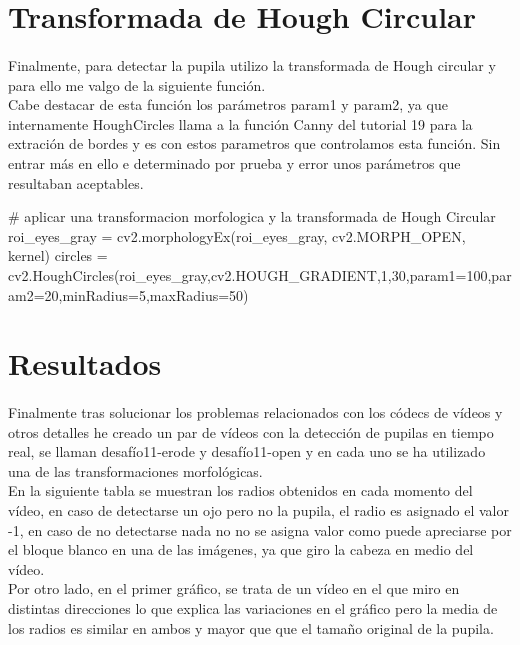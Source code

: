 \documentclass[es,gi]{ifirak}\usepackage[]{graphicx}\usepackage[]{color}
\begin{document}
\section{Transformada de Hough Circular}
\paragraph{}Finalmente, para detectar la pupila utilizo la transformada de Hough circular y para ello me valgo de la siguiente función.\\

Cabe destacar de esta función los parámetros param1 y param2, ya que internamente HoughCircles llama a la función Canny del tutorial 19 para la extración de bordes y es con estos parametros que controlamos esta función. Sin entrar más en ello e determinado por prueba y error unos parámetros que resultaban aceptables.\\

\begin{python}
                # aplicar una transformacion morfologica y la transformada de Hough Circular
                roi_eyes_gray  = cv2.morphologyEx(roi_eyes_gray, cv2.MORPH_OPEN, kernel)
                circles = cv2.HoughCircles(roi_eyes_gray,cv2.HOUGH_GRADIENT,1,30,param1=100,param2=20,minRadius=5,maxRadius=50)
\end{python}

\section{Resultados}
\paragraph{} Finalmente tras solucionar los problemas relacionados con los códecs de vídeos y otros detalles he creado un par de vídeos con la detección de pupilas en tiempo real, se llaman desafío11-erode y desafío11-open y en cada uno se ha utilizado una de las transformaciones morfológicas.\\

En la siguiente tabla se muestran los radios obtenidos en cada momento del vídeo, en caso de detectarse un ojo pero no la pupila, el radio es asignado el valor -1, en caso de no detectarse nada no no se asigna valor como puede apreciarse por el bloque blanco en una de las imágenes, ya que giro la cabeza en medio del vídeo.\\

Por otro lado, en el primer gráfico, se trata de un vídeo en el que miro en distintas direcciones lo que explica las variaciones en el gráfico pero la media de los radios es similar en ambos y mayor que que el tamaño original de la pupila.\\
\end{document}
